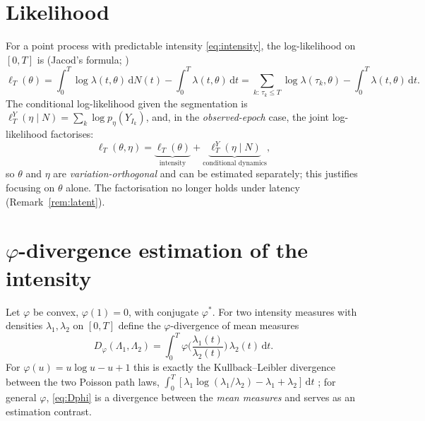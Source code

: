 \documentclass[smallextended,natbib]{svjour3}
\newcommand{\dd}{\,\mathrm{d}}
\newcommand{\Dphi}{D_\varphi}
\begin{document}
\section{Likelihood}\label{sec:lik}
For a point process with predictable intensity \eqref{eq:intensity}, the
log-likelihood on $[0,T]$ is (Jacod's formula; \citealp{bremaud1981,abgk1993})
\begin{equation}\label{eq:loglik}
\ell_T(\theta)=\int_0^T \log\lambda(t,\theta)\dd N(t)-\int_0^T\lambda(t,\theta)\dd t
=\sum_{k:\,\tau_k\le T}\log\lambda(\tau_k,\theta)-\int_0^T\lambda(t,\theta)\dd t .
\end{equation}
The conditional log-likelihood given the segmentation is
$\ell_T^{Y}(\eta\mid N)=\sum_k \log p_\eta(Y_{I_k})$, and, in the
\emph{observed-epoch} case, the joint log-likelihood factorises:
\begin{equation}\label{eq:joint}
\ell_T(\theta,\eta)=\underbrace{\ell_T(\theta)}_{\text{intensity}}
+\underbrace{\ell_T^{Y}(\eta\mid N)}_{\text{conditional dynamics}} ,
\end{equation}
so $\theta$ and $\eta$ are \emph{variation-orthogonal} and can be estimated
separately; this justifies focusing on $\theta$ alone. The factorisation no longer holds
under latency (Remark~\ref{rem:latent}).

\section{$\varphi$-divergence estimation of the intensity}\label{sec:phi}
Let $\varphi$ be convex, $\varphi(1)=0$, with conjugate
$\varphi^\ast$. For two intensity measures with densities $\lambda_1,\lambda_2$ on
$[0,T]$ define the $\varphi$-divergence of mean measures
\begin{equation}\label{eq:Dphi}
\Dphi(\Lambda_1,\Lambda_2)=\int_0^T \varphi\!\Big(\frac{\lambda_1(t)}{\lambda_2(t)}\Big)\,\lambda_2(t)\dd t .
\end{equation}
For $\varphi(u)=u\log u-u+1$ this is exactly the Kullback--Leibler divergence
between the two Poisson path laws,
$\int_0^T[\lambda_1\log(\lambda_1/\lambda_2)-\lambda_1+\lambda_2]\dd t$
\citep{bremaud1981}; for general $\varphi$, \eqref{eq:Dphi} is a divergence
between the \emph{mean measures} and serves as an estimation contrast.
\end{document}

